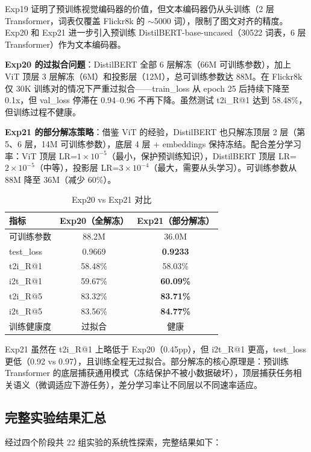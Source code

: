 \documentclass[12pt,a4paper]{article}
\begin{document}
Exp19 证明了预训练视觉编码器的价值，但文本编码器仍从头训练（2 层 Transformer，词表仅覆盖 Flickr8k 的 $\sim$5000 词），限制了图文对齐的精度。Exp20 和 Exp21 进一步引入预训练 DistilBERT-base-uncased（30522 词表，6 层 Transformer）作为文本编码器。

\textbf{Exp20 的过拟合问题}：DistilBERT 全部 6 层解冻（66M 可训练参数），加上 ViT 顶层 3 层解冻（6M）和投影层（12M），总可训练参数达 88M。在 Flickr8k 仅 30K 训练对的情况下严重过拟合——train\_loss 从 epoch 25 后持续下降至 0.1x，但 val\_loss 停滞在 0.94--0.96 不再下降。虽然测试 t2i\_R@1 达到 58.48\%，但训练过程不健康。

\textbf{Exp21 的部分解冻策略}：借鉴 ViT 的经验，DistilBERT 也只解冻顶层 2 层（第 5、6 层，14M 可训练参数），底层 4 层 + embeddings 保持冻结。配合差分学习率：ViT 顶层 LR=$1\times 10^{-5}$（最小，保护预训练知识），DistilBERT 顶层 LR=$2\times 10^{-5}$（中等），投影层 LR=$3\times 10^{-4}$（最大，需要从头学习）。可训练参数从 88M 降至 36M（减少 60\%）。

\begin{table}[H]
\centering
\caption{Exp20 vs Exp21 对比}
\begin{tabular}{lcc}
\toprule
\textbf{指标} & \textbf{Exp20（全解冻）} & \textbf{Exp21（部分解冻）} \\
\midrule
可训练参数 & 88.2M & 36.0M \\
test\_loss & 0.9669 & \textbf{0.9233} \\
t2i\_R@1 & 58.48\% & 58.03\% \\
i2t\_R@1 & 59.67\% & \textbf{60.09\%} \\
t2i\_R@5 & 83.32\% & \textbf{83.71\%} \\
i2t\_R@5 & 83.56\% & \textbf{84.77\%} \\
训练健康度 & 过拟合 & 健康 \\
\bottomrule
\end{tabular}
\end{table}

Exp21 虽然在 t2i\_R@1 上略低于 Exp20（0.45pp），但 i2t\_R@1 更高，test\_loss 更低（0.92 vs 0.97），且训练全程无过拟合。部分解冻的核心原理是：预训练 Transformer 的底层捕获通用模式（冻结保护不被小数据破坏），顶层捕获任务相关语义（微调适应下游任务），差分学习率让不同层以不同速率适应。

\subsection{完整实验结果汇总}

经过四个阶段共 22 组实验的系统性探索，完整结果如下：
\end{document}
